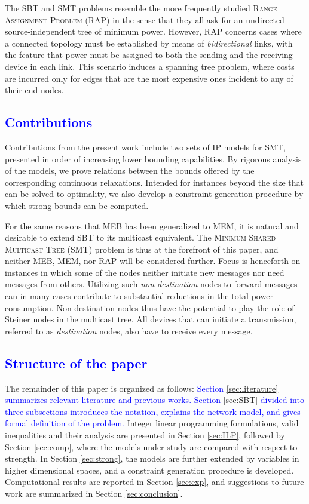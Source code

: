 The SBT and SMT problems resemble the more frequently studied \textsc{Range Assignment Problem} (RAP) in the sense that they all ask for an undirected source-independent tree of minimum power.
However, RAP concerns cases where a connected topology must be established by means of \emph{bidirectional} links,
with the feature that power must be assigned to both the sending and the receiving device in each link.
This scenario induces a spanning tree problem, where costs are incurred only for edges that are the most expensive ones incident to any of their end nodes.

\textcolor{blue}{\subsection{Contributions}}

Contributions from the present work include two sets of IP models for SMT, presented in order of increasing lower bounding capabilities.
By rigorous analysis of the models, we prove relations between the bounds offered by the corresponding continuous relaxations.
Intended for instances beyond the size that can be solved to optimality, we also develop a constraint generation procedure by which strong bounds can be computed.

For the same reasons that MEB has been generalized to MEM, it is natural and desirable to extend SBT to its multicast equivalent.
The \textsc{Minimum Shared Multicast Tree} (SMT) problem is thus at the forefront of this paper,
and neither MEB, MEM, nor RAP will be considered further.
Focus is henceforth on instances in which some of the nodes neither initiate new messages nor need messages from others.
Utilizing such \emph{non-destination} nodes to forward messages can in many cases contribute to substantial reductions in the total power consumption.
Non-destination nodes thus have the potential to play the role of Steiner nodes in the multicast tree.
All devices that can initiate a transmission, referred to as \emph{destination} nodes, also have to receive every message.


\textcolor{blue}{\subsection{Structure of the paper}}

The remainder of this paper is organized as follows: 
\textcolor{blue}{Section \ref{sec:literature} summarizes relevant literature and previous works.}
\textcolor{blue}{Section \ref{sec:SBT} divided into three subsections introduces the notation, explains the network model, and gives formal definition of the problem.}
Integer linear programming formulations, valid inequalities and their analysis are presented in Section \ref{sec:ILP},
followed by Section \ref{sec:comp}, where the models under study are compared with respect to strength.
In Section \ref{sec:strong}, the models are further extended by variables in higher dimensional spaces,
and a constraint generation procedure is developed.
Computational results are reported in Section \ref{sec:exp},
and suggestions to future work are summarized in Section \ref{sec:conclusion}.
